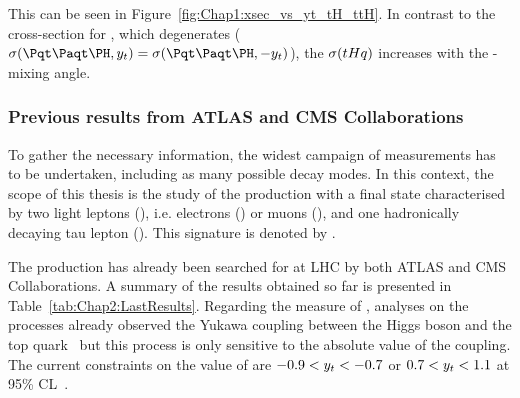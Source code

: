 This can be seen in Figure~\ref{fig:Chap1:xsec_vs_yt_tH_ttH}. 
In contrast to the cross-section for \ttH, which degenerates ($\sigma(\ttH, \yt) = \sigma(\ttH, -\yt)$),
the $\sigma(tHq)$ increases with the \CP-mixing angle.




\subsubsection{Previous results from ATLAS and CMS Collaborations}


To gather the necessary information, the widest campaign of measurements has to 
be undertaken, including as many possible decay modes. 
In this context, the scope of this thesis is the study of the production \tHq with a final state 
characterised by two light leptons (\Plepton), i.e. electrons (\Pepm) or muons (\Pmupm), and one
hadronically decaying tau lepton (\tauhad). This signature is denoted by \dileptau.

The \tHq production has already been searched for at LHC by both ATLAS and CMS Collaborations.
A summary of the results obtained so far is presented in Table~\ref{tab:Chap2:LastResults}.
Regarding the measure of \yt, analyses on the \ttH processes already observed the  
Yukawa coupling between the Higgs boson and the top quark~\cite{ATLAS:2018mme}
but this process is only sensitive to the absolute value of the coupling. The current
constraints on the value of \yt are  $-0.9<y_{t} <-0.7$ or $0.7<y_{t} <1.1$ at 95\% CL~\cite{CMS:2020mpn}.

